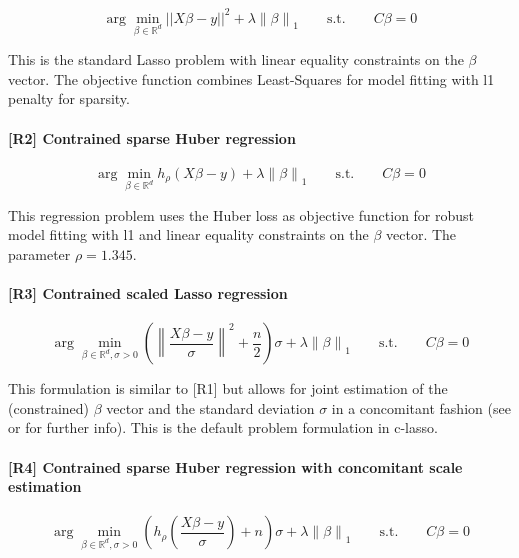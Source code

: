\documentclass[article]{jss}
\newcommand{\norm}[1]{\left\lVert#1\right\rVert}
\begin{document}
\begin{equation*}
    \arg \min_{\beta \in \mathbb{R}^d} || X\beta - y ||^2 + \lambda \norm{\beta}_1 \qquad \mbox{s.t.} \qquad  C\beta = 0
\end{equation*}

This is the standard Lasso problem with linear equality constraints on the $\beta$ vector. The objective function combines Least-Squares for model fitting with l1 penalty for sparsity.

\paragraph{[R2] Contrained sparse Huber regression}

\begin{equation*}
    \arg \min_{\beta \in \mathbb{R}^d} h_{\rho} (X\beta - y) + \lambda \norm{\beta}_1 \qquad \mbox{s.t.} \qquad  C\beta = 0
\end{equation*}

This regression problem uses the Huber loss as objective function for robust model fitting with l1 and linear equality constraints on the $\beta$ vector. The parameter $\rho=1.345$.

\paragraph{[R3] Contrained scaled Lasso regression}

\begin{equation*}
    \arg \min_{\beta \in \mathbb{R}^d, \sigma > 0} \left( \norm{\frac{ X\beta - y }{\sigma}}^2 + \frac{n}{2} \right) \sigma+ \lambda \norm{\beta}_1 \qquad \mbox{s.t.} \qquad  C\beta = 0
\end{equation*}

This formulation is similar to [R1] but allows for joint estimation of the (constrained) $\beta$ vector and the standard deviation $\sigma$ in a concomitant fashion (see \cite{Compositional} or \cite{combettes2019regression} for further info). This is the default problem formulation in c-lasso.

\paragraph{[R4] Contrained sparse Huber regression with concomitant scale estimation}

\begin{equation*}
    \arg \min_{\beta \in \mathbb{R}^d, \sigma > 0} \left( h_{\rho} \left( \frac{ X\beta - y}{\sigma} \right)+ n \right) \sigma+ \lambda \norm{\beta}_1 \qquad \mbox{s.t.} \qquad  C\beta = 0
\end{equation*}
\end{document}
